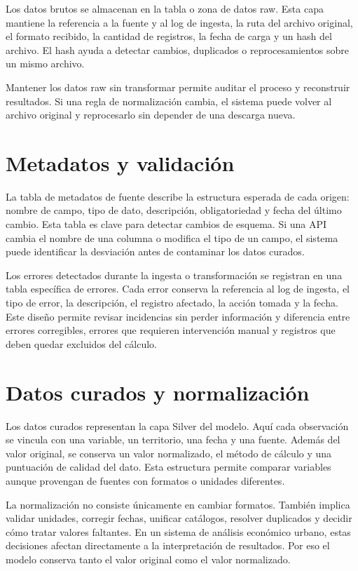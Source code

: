 Los datos brutos se almacenan en la tabla o zona de datos raw. Esta capa mantiene la referencia a la fuente y al log de ingesta, la ruta del archivo original, el formato recibido, la cantidad de registros, la fecha de carga y un hash del archivo. El hash ayuda a detectar cambios, duplicados o reprocesamientos sobre un mismo archivo.

Mantener los datos raw sin transformar permite auditar el proceso y reconstruir resultados. Si una regla de normalización cambia, el sistema puede volver al archivo original y reprocesarlo sin depender de una descarga nueva.

\section{Metadatos y validación}

La tabla de metadatos de fuente describe la estructura esperada de cada origen: nombre de campo, tipo de dato, descripción, obligatoriedad y fecha del último cambio. Esta tabla es clave para detectar cambios de esquema. Si una API cambia el nombre de una columna o modifica el tipo de un campo, el sistema puede identificar la desviación antes de contaminar los datos curados.

Los errores detectados durante la ingesta o transformación se registran en una tabla específica de errores. Cada error conserva la referencia al log de ingesta, el tipo de error, la descripción, el registro afectado, la acción tomada y la fecha. Este diseño permite revisar incidencias sin perder información y diferencia entre errores corregibles, errores que requieren intervención manual y registros que deben quedar excluidos del cálculo.

\section{Datos curados y normalización}

Los datos curados representan la capa Silver del modelo. Aquí cada observación se vincula con una variable, un territorio, una fecha y una fuente. Además del valor original, se conserva un valor normalizado, el método de cálculo y una puntuación de calidad del dato. Esta estructura permite comparar variables aunque provengan de fuentes con formatos o unidades diferentes.

La normalización no consiste únicamente en cambiar formatos. También implica validar unidades, corregir fechas, unificar catálogos, resolver duplicados y decidir cómo tratar valores faltantes. En un sistema de análisis económico urbano, estas decisiones afectan directamente a la interpretación de resultados. Por eso el modelo conserva tanto el valor original como el valor normalizado.

